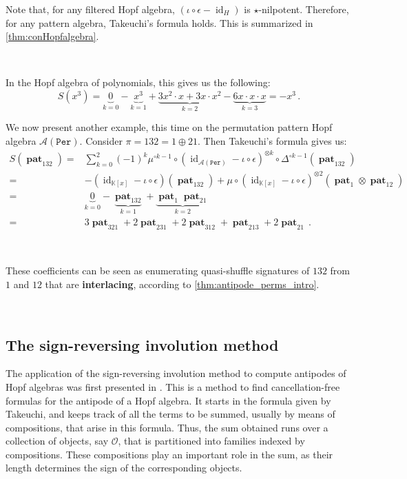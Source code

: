 \documentclass[12pt, reqno]{amsart}
\theoremstyle{definition}
\DeclareMathOperator{\id}{id}
\DeclareMathOperator{\pat}{\mathbf{pat}}
\begin{document}
Note that, for any filtered Hopf algebra, $( \iota \circ \epsilon - \id_H)$ is $\star$-nilpotent.
Therefore, for any pattern algebra, Takeuchi's formula holds.
This is summarized in \cref{thm:conHopfalgebra}.

\

In the Hopf algebra of polynomials, this gives us the following:
$$S(x^3) = \underbrace{0}_{k = 0} - \underbrace{x^3}_{k = 1} + \underbrace{3 x^2 \cdot x + 3 x \cdot x^2}_{k=2} - \underbrace{6 x \cdot x \cdot x}_{k = 3} = - x^3 \, .$$


We now present another example, this time on the permutation pattern Hopf algebra $\mathcal A(\mathtt{Per})$.
Consider $\pi = 132 = 1 \oplus 21$. Then Takeuchi's formula gives us:
\begin{align*}
S(\pat_{132}) =& \sum_{k=0}^2 (-1)^k \mu^{\circ k-1} \circ (\id_{\mathcal A(\mathtt{Per})} - \iota \circ \epsilon)^{\otimes k} \circ \Delta^{\circ k-1}(\pat_{132})\\
=& -(\id_{\mathbb{K}[x]} - \iota \circ \epsilon)(\pat_{132}) + \mu \circ (\id_{\mathbb{K}[x]} - \iota\circ\epsilon)^{\otimes 2}(\pat_1 \otimes \pat_{12}) \\
=& \underbrace{0}_{k = 0} - \underbrace{\pat_{132}}_{k=1} + \underbrace{\pat_1 \pat_{21}}_{k=2} \\
=& 3 \pat_{321} + 2 \pat_{231} + 2 \pat_{312} + \pat_{213} + 2 \pat_{21} \, .
\end{align*}

\

These coefficients can be seen as enumerating quasi-shuffle signatures of $132$ from $1$ and $12$ that are \textbf{interlacing}, according to \cref{thm:antipode_perms_intro}.



\

\subsection{The sign-reversing involution method}

The application of the sign-reversing involution method to compute antipodes of Hopf algebras was first presented in \cite{BS2017}.
This is a method to find cancellation-free formulas for the antipode of a Hopf algebra.
It starts in the formula given by Takeuchi, and keeps track of all the terms to be summed, usually by means of compositions, that arise in this formula.
Thus, the sum obtained runs over a collection of objects, say $\mathcal O$, that is partitioned into families indexed by compositions.
These compositions play an important role in the sum, as their length determines the sign of the corresponding objects.
\end{document}
